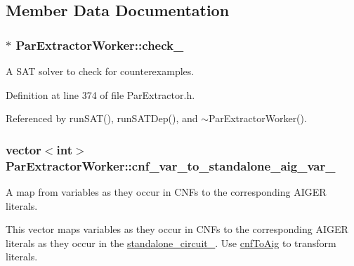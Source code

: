 \subsection{Member Data Documentation}
\hypertarget{classParExtractorWorker_aa501458322a206e0ab66a4005cac963c}{
\subsubsection[{check\-\_\-}]{$\ast$ Par\-Extractor\-Worker\-::check\-\_\-\hspace{0.3cm}{\ttfamily [protected]}}}\label{classParExtractorWorker_aa501458322a206e0ab66a4005cac963c}


A S\-A\-T solver to check for counterexamples. 



Definition at line 374 of file Par\-Extractor.\-h.



Referenced by run\-S\-A\-T(), run\-S\-A\-T\-Dep(), and $\sim$\-Par\-Extractor\-Worker().

\hypertarget{classParExtractorWorker_a90ef43d28785c5c5607159ddc7b54ce3}{
\subsubsection[{cnf\-\_\-var\-\_\-to\-\_\-standalone\-\_\-aig\-\_\-var\-\_\-}]{\setlength{\rightskip}{0pt plus 5cm}vector$<$int$>$ Par\-Extractor\-Worker\-::cnf\-\_\-var\-\_\-to\-\_\-standalone\-\_\-aig\-\_\-var\-\_\-\hspace{0.3cm}{\ttfamily [protected]}}}\label{classParExtractorWorker_a90ef43d28785c5c5607159ddc7b54ce3}


A map from variables as they occur in C\-N\-Fs to the corresponding A\-I\-G\-E\-R literals. 

This vector maps variables as they occur in C\-N\-Fs to the corresponding A\-I\-G\-E\-R literals as they occur in the \hyperlink{classParExtractorWorker_a233a7f99946695b0640e76ead6932fbb}{standalone\-\_\-circuit\-\_\-}. Use \hyperlink{classParExtractorWorker_af32545578987bf8d7e2d6c09fb24e716}{cnf\-To\-Aig} to transform literals.

